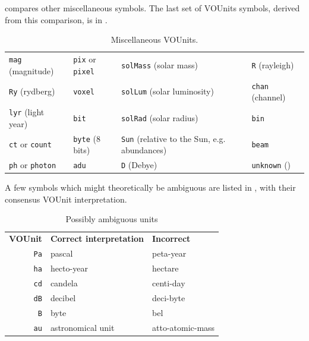 \documentclass[11pt,a4paper]{ivoa}
\newcommand{\unit}[1]{\texttt{\small\color{orange}#1}}
\begin{document}
 compares other miscellaneous symbols. 
The last set of VOUnits symbols, derived from this comparison, is in
.

\begin{table}[ht]
\begin{center}
\def\arraystretch{1.2}
\begin{tabular}{|l|l|L{2.9cm}|l|}\hline
\unit{mag} (magnitude)		&\unit{pix}  or \unit{pixel} 	&\unit{solMass} (solar mass)     &\unit{R} (rayleigh) \\
\unit{Ry} (rydberg)		&\unit{voxel}    		&\unit{solLum} (solar luminosity)&\unit{chan} (channel) 	\\
\unit{lyr} (light year)		&\unit{bit}   			&\unit{solRad} (solar radius)	&\unit{bin} \\
\unit{ct} or \unit{count}	&\unit{byte} (8 bits)   	&\unit{Sun} (relative to the Sun, e.g. abundances)&\unit{beam} 	\\
\unit{ph} or \unit{photon} 	&\unit{adu}                     &\unit{D} (Debye)	&\unit{unknown} ()\\\hline
\end{tabular}
\end{center}
\caption[Miscellaneous VOUnits]
{\label{tab:voumisc}Miscellaneous VOUnits.}
\end{table}

A few symbols which might theoretically be ambiguous are listed in
,
with their consensus VOUnit interpretation.

\begin{table}[bht]
\begin{center}
\begin{tabular}{|r|l|l|}
\hline
\textbf{VOUnit}&\textbf{Correct interpretation}&\textbf{Incorrect}\\
\unit{Pa}&pascal&peta-year\\
\unit{ha}&hecto-year&hectare\\
\unit{cd}&candela&centi-day\\
\unit{dB}&decibel&deci-byte\\
\unit{B}&byte&bel\\
\unit{au}&astronomical unit&atto-atomic-mass\\
\hline
\end{tabular}
\end{center}
\caption{\label{tab:ambiguous}Possibly ambiguous units}
\end{table}
\end{document}
